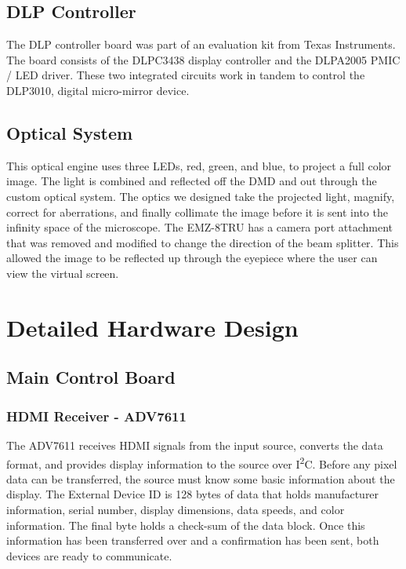 \documentclass[12pt,a4paper]{article}
\begin{document}
\subsection{DLP Controller}
The DLP controller board was part of an evaluation kit from Texas Instruments. The board consists of the DLPC3438 display controller and the DLPA2005 PMIC / LED driver. These two integrated circuits work in tandem to control the DLP3010, digital micro-mirror device.

\subsection{Optical System}
This optical engine uses three LEDs, red, green, and blue, to project a full color image. The light is combined and reflected off the DMD and out through the custom optical system. The optics we designed take the projected light, magnify, correct for aberrations, and finally collimate the image before it is sent into the infinity space of the microscope. The EMZ-8TRU has a camera port attachment that was removed and modified to change the direction of the beam splitter. This allowed the image to be reflected up through the eyepiece where the user can view the virtual screen.




\section{Detailed Hardware Design}

\subsection{Main Control Board}
\subsubsection{HDMI Receiver - ADV7611}
The ADV7611 receives HDMI signals from the input source, converts the data format, and provides display information to the source over I\textsuperscript{2}C. Before any pixel data can be transferred, the source must know some basic information about the display. The External Device ID is 128 bytes of data that holds manufacturer information, serial number, display dimensions, data speeds, and color information. The final byte holds a check-sum of the data block. Once this information has been transferred over and a confirmation has been sent, both devices are ready to communicate.
\end{document}
